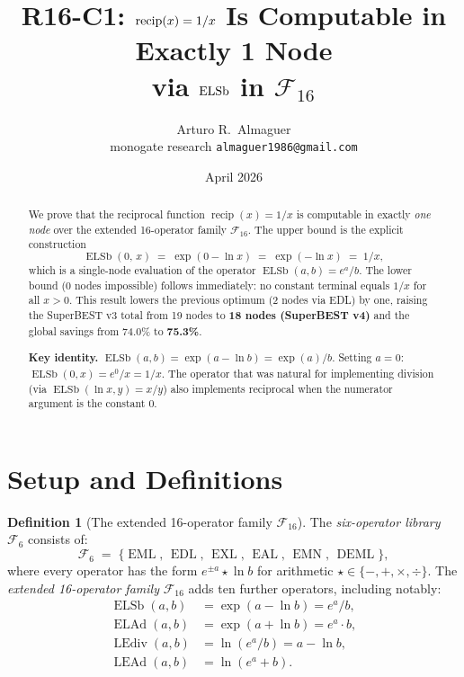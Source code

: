 \documentclass[12pt,a4paper]{article}
\title{R16-C1: $\recip(x) = 1/x$ Is Computable in Exactly 1 Node\\
       via $\ELSb$ in $\mathcal{F}_{16}$}
\author{Arturo R.\ Almaguer\\
\small monogate research \quad \texttt{almaguer1986@gmail.com}}
\date{April 2026}
\theoremstyle{definition}
\newtheorem{definition}[theorem]{Definition}
\newcommand{\EML}{\operatorname{EML}}
\newcommand{\EDL}{\operatorname{EDL}}
\newcommand{\EXL}{\operatorname{EXL}}
\newcommand{\EAL}{\operatorname{EAL}}
\newcommand{\EMN}{\operatorname{EMN}}
\newcommand{\DEML}{\operatorname{DEML}}
\newcommand{\ELAd}{\operatorname{ELAd}}
\newcommand{\ELSb}{\operatorname{ELSb}}
\newcommand{\LEAd}{\operatorname{LEAd}}
\newcommand{\LEdiv}{\operatorname{LEdiv}}
\newcommand{\recip}{\operatorname{recip}}
\begin{document}
\maketitle

\begin{abstract}
We prove that the reciprocal function $\recip(x) = 1/x$ is computable
in exactly \emph{one node} over the extended 16-operator family
$\mathcal{F}_{16}$.
The upper bound is the explicit construction
\[
  \ELSb(0,\,x) \;=\; \exp(0 - \ln x) \;=\; \exp(-\ln x) \;=\; 1/x,
\]
which is a single-node evaluation of the operator $\ELSb(a,b) = e^a/b$.
The lower bound (0 nodes impossible) follows immediately: no constant
terminal equals $1/x$ for all $x > 0$.
This result lowers the previous optimum (2 nodes via EDL) by one, raising
the SuperBEST v3 total from 19 nodes to \textbf{18 nodes (SuperBEST v4)}
and the global savings from 74.0\% to \textbf{75.3\%}.

\medskip\noindent
\textbf{Key identity.}
$\ELSb(a,b) = \exp(a - \ln b) = \exp(a)/b$.
Setting $a = 0$: $\ELSb(0,x) = e^0/x = 1/x$.
The operator that was natural for implementing division (via
$\ELSb(\ln x, y) = x/y$) also implements reciprocal
when the numerator argument is the constant $0$.
\end{abstract}

\tableofcontents
\bigskip

\section{Setup and Definitions}

\begin{definition}[The extended 16-operator family $\mathcal{F}_{16}$]
\label{def:F16}
The \emph{six-operator library} $\mathcal{F}_6$ consists of:
\[
  \mathcal{F}_6 \;=\; \{\EML,\,\EDL,\,\EXL,\,\EAL,\,\EMN,\,\DEML\},
\]
where every operator has the form $e^{\pm a} \star \ln b$ for arithmetic
$\star \in \{-,+,\times,\div\}$.
The \emph{extended 16-operator family} $\mathcal{F}_{16}$ adds ten further
operators, including notably:
\begin{align*}
  \ELSb(a,b) &= \exp(a - \ln b) = e^a / b, \\
  \ELAd(a,b) &= \exp(a + \ln b) = e^a \cdot b, \\
  \LEdiv(a,b) &= \ln(e^a / b) = a - \ln b, \\
  \LEAd(a,b)  &= \ln(e^a + b).
\end{align*}
\end{definition}
\end{document}
